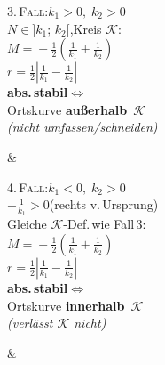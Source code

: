\begin{formelreihe}
  \parbox[t]{\linewidth}{%
    {\scriptsize\scshape\color{cKap6!80!black} 3.\,Fall:\;$k_1\!>\!0,\;k_2\!>\!0$}\\[0.03em]%
    \scriptsize $N\!\in\!]k_1;\,k_2[$,\;Kreis $\mathcal{K}$:\\[0.04em]
    $M\!=\!-\tfrac{1}{2}\!\left(\tfrac{1}{k_1}+\tfrac{1}{k_2}\right)$\\[0.05em]
    $r\!=\!\tfrac{1}{2}\!\left|\tfrac{1}{k_1}-\tfrac{1}{k_2}\right|$\\[0.04em]
    \textbf{abs.\,stabil}\;$\Leftrightarrow$\\
    Ortskurve \textbf{außerhalb}~$\mathcal{K}$\\
    \textit{(nicht umfassen/schneiden)}} &
  \parbox[t]{\linewidth}{%
    {\scriptsize\scshape\color{cKap6!80!black} 4.\,Fall:\;$k_1\!<\!0,\;k_2\!>\!0$}\\[0.03em]%
    \scriptsize $-\tfrac{1}{k_1}>0$\;(rechts v.\,Ursprung)\\[0.04em]
    Gleiche $\mathcal{K}$-Def.\,wie Fall\,3:\\[0.03em]
    $M\!=\!-\tfrac{1}{2}(\tfrac{1}{k_1}+\tfrac{1}{k_2})$\\[0.04em]
    $r\!=\!\tfrac{1}{2}|\tfrac{1}{k_1}-\tfrac{1}{k_2}|$\\[0.04em]
    \textbf{abs.\,stabil}\;$\Leftrightarrow$\\
    Ortskurve \textbf{innerhalb}~$\mathcal{K}$\\
    \textit{(verlässt $\mathcal{K}$ nicht)}} &
   \\[0.3em]


\end{formelreihe}
